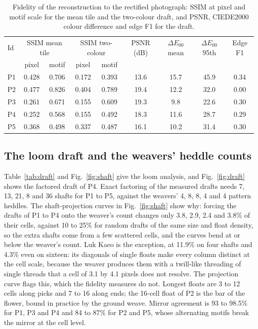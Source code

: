 \documentclass[12pt]{article}
\begin{document}
\begin{table}[htbp]
\centering\footnotesize
\caption{Fidelity of the reconstruction to the rectified photograph: SSIM at pixel and motif scale for the mean tile and the two-colour draft, and PSNR, CIEDE2000 colour difference and edge F1 for the draft.}
\label{tab:fid}
\begin{tabular}{lcccccccc}
Id & \multicolumn{2}{c}{SSIM mean tile} & \multicolumn{2}{c}{SSIM two-colour} & PSNR (dB) & $\Delta E_{00}$ mean & $\Delta E_{00}$ 95th & Edge F1 \\
 & pixel & motif & pixel & motif & & & & \\
\midrule
P1 & 0.428 & 0.706 & 0.172 & 0.393 & 13.6 & 15.7 & 45.9 & 0.34 \\
P2 & 0.477 & 0.826 & 0.404 & 0.789 & 19.4 & 12.2 & 32.0 & 0.00 \\
P3 & 0.261 & 0.671 & 0.155 & 0.609 & 19.3 & 9.8 & 22.6 & 0.30 \\
P4 & 0.252 & 0.568 & 0.155 & 0.492 & 18.3 & 11.6 & 28.7 & 0.29 \\
P5 & 0.368 & 0.498 & 0.337 & 0.487 & 16.1 & 10.2 & 31.4 & 0.30 \\
\end{tabular}
\end{table}
\subsection{The loom draft and the weavers' heddle counts}

Table~\ref{tab:draft} and Fig.~\ref{fig:shaft} give the loom analysis, and Fig.~\ref{fig:draft} shows the factored draft of P4. Exact factoring of the measured drafts needs 7, 13, 21, 8 and 36 shafts for P1 to P5, against the weavers' 4, 8, 8, 4 and 4 pattern heddles. The shaft-projection curves in Fig.~\ref{fig:shaft} show why: forcing the drafts of P1 to P4 onto the weaver's count changes only 3.8, 2.9, 2.4 and 3.8\% of their cells, against 10 to 25\% for random drafts of the same size and float density, so the extra shafts come from a few scattered cells, and the curves bend at or below the weaver's count. Luk Kaeo is the exception, at 11.9\% on four shafts and 4.3\% even on sixteen: its diagonals of single floats make every column distinct at the cell scale, because the weaver produces them with a twill-like threading of single threads that a cell of 3.1 by 4.1 pixels does not resolve. The projection curve flags this, which the fidelity measures do not. Longest floats are 3 to 12 cells along picks and 7 to 16 along ends; the 16-cell float of P2 is the bar of the flower, bound in practice by the ground weave. Mirror agreement is 93 to 98.5\% for P1, P3 and P4 and 84 to 87\% for P2 and P5, whose alternating motifs break the mirror at the cell level.
\end{document}
